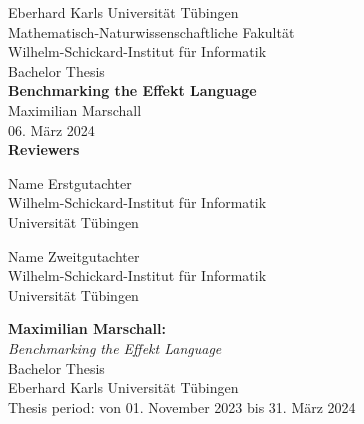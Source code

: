 \documentclass[a4paper,UKenglish,compactauthor]{lipics-v2021}
\title{\thesisTitle}
\newcommand{\authorName}{Maximilian Marschall}
\newcommand{\thesisTitle}{Benchmarking the Effekt Language}
\newcommand{\thesisDate}{06. März 2024}
\begin{document}

\begin{titlepage}
 \begin{center}
  {\LARGE Eberhard Karls Universität Tübingen}\\
  {\large Mathematisch-Naturwissenschaftliche Fakultät \\
Wilhelm-Schickard-Institut für Informatik\\[4cm]}
  {\huge Bachelor Thesis\\[2cm]}
  {\Large\bf  \thesisTitle\\[1.5cm]}
 {\large \authorName}\\[0.5cm]
\thesisDate\\[4cm]
{\small\bf Reviewers}\\[0.5cm]
  \parbox{7cm}%
  {\begin{center}{\large Name Erstgutachter}\\
    {\footnotesize Wilhelm-Schickard-Institut für Informatik\\
	  Universität Tübingen\vspace{0.4cm}}\end{center}}\hfill\parbox{7cm}%
  {\begin{center}
    {\large Name Zweitgutachter}\\
    {\footnotesize Wilhelm-Schickard-Institut für Informatik\\
	  Universität Tübingen}\end{center}
  }
  \end{center}
\end{titlepage}


\thispagestyle{empty}
\vspace*{\fill}
\begin{minipage}{11.2cm}
\textbf{\authorName:}\\
\emph{\thesisTitle}\\ Bachelor Thesis\\
Eberhard Karls Universität Tübingen\\
Thesis period: von 01. November 2023 bis 31. März 2024
\end{minipage}
\newpage
\end{document}
